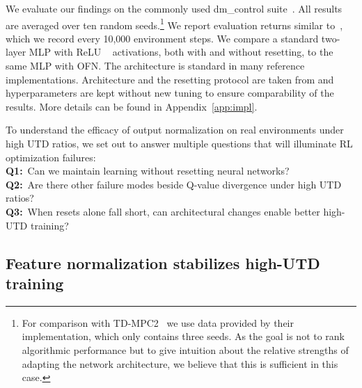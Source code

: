We evaluate our findings on the commonly used \textsf{dm\_control} suite~\parencite{tunyasuvunakool2020dmcontrol}. All results are averaged over ten random seeds.\footnote{For comparison with TD-MPC2~\parencite{hansen2024tdmpc} we use data provided by their implementation, which only contains three seeds. As the goal is not to rank algorithmic performance but to give intuition about the relative strengths of adapting the network architecture, we believe that this is sufficient in this case.} We report evaluation returns similar to~\textcite{nikishin2022primacy}, which we record every 10,000 environment steps. We compare a standard two-layer MLP with ReLU ~\parencite{nair2010rectified} activations, both with and without resetting, to the same MLP with OFN. %
The architecture is standard in many reference implementations. Architecture and the resetting protocol are taken from \textcite{doro2023barrier} and hyperparameters are kept without new tuning to ensure comparability of the results. More details can be found in Appendix~\ref{app:impl}.

To understand the efficacy of output normalization on real environments under high UTD ratios, we set out to answer multiple questions that will illuminate RL optimization failures:\\
{\bf Q1:}~Can we maintain learning without resetting neural networks?\\
{\bf Q2:}~Are there other failure modes beside Q-value divergence under high UTD ratios?\\
{\bf Q3:}~When resets alone fall short, can architectural changes enable better high-UTD training?

\subsection{Feature normalization stabilizes high-UTD training} 

